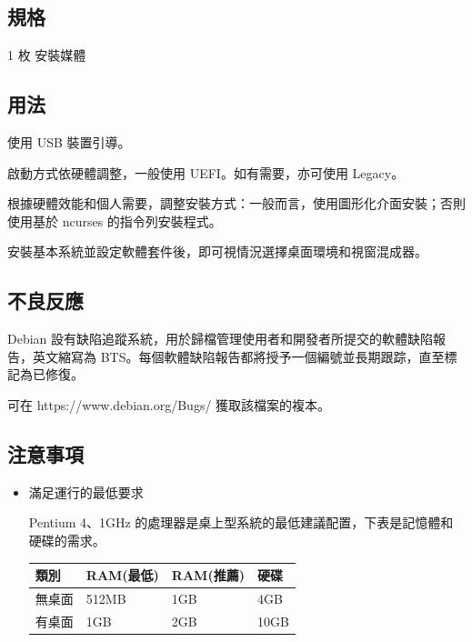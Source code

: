 \documentclass[UTF8]{article}
\begin{document}
\begin{multicols*}{3}
	\begin{tcolorbox}
	\section*{規格}
	\end{tcolorbox}

	1 枚 安裝媒體

	\medskip

	\begin{tcolorbox}
	\section*{用法}
	\end{tcolorbox}

	使用 USB 裝置引導。

	啟動方式依硬體調整，一般使用 UEFI。如有需要，亦可使用 Legacy。

	根據硬體效能和個人需要，調整安裝方式：一般而言，使用圖形化介面安裝；否則使用基於 ncurses 的指令列安裝程式。

	安裝基本系統並設定軟體套件後，即可視情況選擇桌面環境和視窗混成器。

	\medskip

	\begin{tcolorbox}
	\section*{不良反應}
	\end{tcolorbox}

	Debian 設有缺陷追蹤系統，用於歸檔管理使用者和開發者所提交的軟體缺陷報告，英文縮寫為 BTS。每個軟體缺陷報告都將授予一個編號並長期跟踪，直至標記為已修復。

	可在 https://www.debian.org/Bugs/ 獲取該檔案的複本。

	\medskip


	\begin{tcolorbox}
	\section*{注意事項}
	\end{tcolorbox}
	\begin{itemize}[leftmargin=*]

		\item 滿足運行的最低要求

		Pentium 4、1GHz 的處理器是桌上型系統的最低建議配置，下表是記憶體和硬碟的需求。

		{\small\begin{tabularx}{\linewidth}{|X|X|X|X|}
			\hline
			類別 & RAM\newline (最低) & RAM\newline (推薦) & 硬碟 \\
			\hline
			無桌面 & 512MB & 1GB & 4GB \\
			\hline
			有桌面 & 1GB & 2GB & 10GB \\
			\hline
		\end{tabularx}}


\end{itemize}
\end{multicols*}
\end{document}
